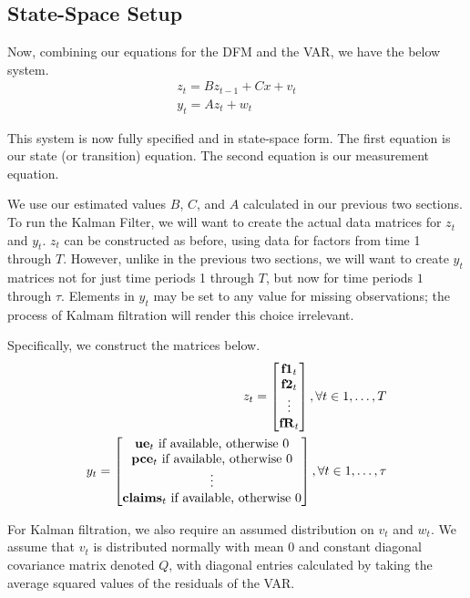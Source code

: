 \documentclass[11pt, letterpaper]{article}\usepackage[]{graphicx}\usepackage[]{color}
\newcommand{\vv}[1]{\textcolor{black}{\mathbf{#1}}}
\begin{document}
\subsection{State-Space Setup}
Now, combining our equations for the DFM and the VAR, we have the below system.
\begin{align*}
z_t = B z_{t-1} + Cx + v_t\\
y_t = A z_t + w_t
\end{align*}

This system is now fully specified and in state-space form. The first equation is our state (or transition) equation. The second equation is our measurement equation. 

We use our estimated values $B$, $C$, and $A$ calculated in our previous two sections. To run the Kalman Filter, we will want to create the actual data matrices for $z_t$ and $y_t$. $z_t$ can be constructed as before, using data for factors from time 1 through $T$. However, unlike in the previous two sections, we will want to create $y_t$ matrices not for just time periods 1 through $T$, but now for time periods $1$ through $\tau$. Elements in $y_t$ may be set to any value for missing observations; the process of Kalmam filtration will render this choice irrelevant.

Specifically, we construct the matrices below.
\begin{align*}
z_t
=
\begin{bmatrix}
	\vv{f1}_{t}\\
	\vv{f2}_{t}\\
	\vdots \\
	\vv{fR}_{t}
\end{bmatrix}, \forall t \in 1, \dots, T\\
y_t
=
\begin{bmatrix}
	\text{$\vv{ue}_{t}$ if available, otherwise 0}\\
	\text{$\vv{pce}_{t}$ if available, otherwise 0}\\
	\vdots \\
	\text{$\vv{claims}_{t}$ if available, otherwise 0}\\
\end{bmatrix}, \forall t \in 1, \dots, \tau
\end{align*}

For Kalman filtration, we also require an assumed distribution on $v_t$ and $w_t$. We assume that $v_t$ is distributed normally with mean 0 and constant diagonal covariance matrix denoted $Q$, with diagonal entries calculated by taking the average squared values of the residuals of the VAR.
\end{document}
